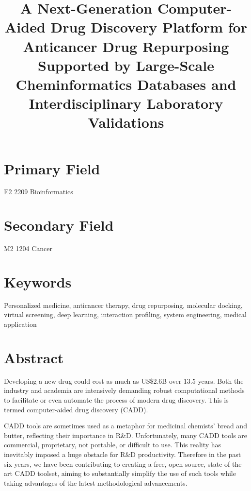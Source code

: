 \documentclass[a4paper,12pt]{article}
\begin{document}
\title{A Next-­Generation Computer­-Aided Drug Discovery Platform for Anticancer Drug Repurposing Supported by Large-­Scale Cheminformatics Databases and Interdisciplinary Laboratory Validations}
\maketitle

\section*{Primary Field}

E2 2209 Bioinformatics

\section*{Secondary Field}

M2 1204 Cancer

\section*{Keywords}

Personalized medicine, anticancer therapy, drug repurposing, molecular docking, virtual screening, deep learning, interaction profiling, system engineering, medical application

\newpage
\section*{Abstract}

Developing a new drug could cost as much as US\$2.6B over 13.5 years. Both the industry and academia are intensively demanding robust computational methods to facilitate or even automate the process of modern drug discovery. This is termed computer-aided drug discovery (CADD).

CADD tools are sometimes used as a metaphor for medicinal chemists' bread and butter, reflecting their importance in R\&D. Unfortunately, many CADD tools are commercial, proprietary, not portable, or difficult to use. This reality has inevitably imposed a huge obstacle for R\&D productivity. Therefore in the past six years, we have been contributing to creating a free, open source, state-of-the-art CADD toolset, aiming to substantially simplify the use of such tools while taking advantages of the latest methodological advancements.
\end{document}
